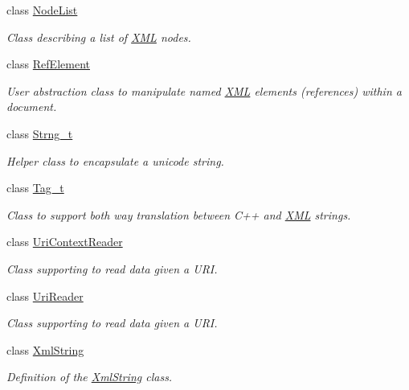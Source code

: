 \begin{DoxyCompactItemize}
class \hyperlink{class_d_d4hep_1_1_x_m_l_1_1_node_list}{Node\+List}
\begin{DoxyCompactList}\small\item\em Class describing a list of \hyperlink{namespace_d_d4hep_1_1_x_m_l}{X\+ML} nodes. \end{DoxyCompactList}\item 
class \hyperlink{class_d_d4hep_1_1_x_m_l_1_1_ref_element}{Ref\+Element}
\begin{DoxyCompactList}\small\item\em User abstraction class to manipulate named \hyperlink{namespace_d_d4hep_1_1_x_m_l}{X\+ML} elements (references) within a document. \end{DoxyCompactList}\item 
class \hyperlink{class_d_d4hep_1_1_x_m_l_1_1_strng__t}{Strng\+\_\+t}
\begin{DoxyCompactList}\small\item\em Helper class to encapsulate a unicode string. \end{DoxyCompactList}\item 
class \hyperlink{class_d_d4hep_1_1_x_m_l_1_1_tag__t}{Tag\+\_\+t}
\begin{DoxyCompactList}\small\item\em Class to support both way translation between C++ and \hyperlink{namespace_d_d4hep_1_1_x_m_l}{X\+ML} strings. \end{DoxyCompactList}\item 
class \hyperlink{class_d_d4hep_1_1_x_m_l_1_1_uri_context_reader}{Uri\+Context\+Reader}
\begin{DoxyCompactList}\small\item\em Class supporting to read data given a U\+RI. \end{DoxyCompactList}\item 
class \hyperlink{class_d_d4hep_1_1_x_m_l_1_1_uri_reader}{Uri\+Reader}
\begin{DoxyCompactList}\small\item\em Class supporting to read data given a U\+RI. \end{DoxyCompactList}\item 
class \hyperlink{class_d_d4hep_1_1_x_m_l_1_1_xml_string}{Xml\+String}
\begin{DoxyCompactList}\small\item\em Definition of the \hyperlink{class_d_d4hep_1_1_x_m_l_1_1_xml_string}{Xml\+String} class. \end{DoxyCompactList}\end{DoxyCompactItemize}
